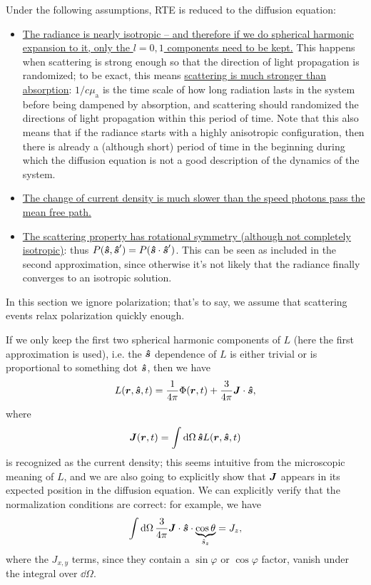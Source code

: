 \documentclass[hyperref, a4paper]{article}
\begin{document}
Under the following assumptions, RTE is reduced to the diffusion equation: 
\begin{itemize}
    \item \ul{The radiance is nearly isotropic 
    -- and therefore if we do spherical harmonic expansion to it, 
    only the $l = 0, 1$ components need to be kept.} 
    This happens when scattering is strong enough 
    so that the direction of light propagation 
    is randomized; 
    to be exact, this means \ul{scattering is much stronger than absorption}:
    $1 / c \mu_{\text{a}}$ is the time scale of 
    how long radiation lasts in the system before being dampened by absorption, 
    and scattering should randomized the directions of light propagation 
    within this period of time. 
    Note that this also means that if the radiance starts with a highly 
    anisotropic configuration, 
    then there is already a (although short) period of time in the beginning 
    during which the diffusion equation is not a good description 
    of the dynamics of the system. 
    \item \ul{The change of current density is much slower 
    than the speed photons pass the mean free path.}
    \item \ul{The scattering property has rotational symmetry (although not completely isotropic)}:
        thus $P(\vu*{s}, \vu*{s}') = P(\vu*{s} \cdot \vu*{s}')$.
        This can be seen as included in the second approximation, 
        since otherwise it's not likely that the radiance finally converges to 
        an isotropic solution.
\end{itemize}

In this section we ignore polarization;
that's to say, we assume that scattering events 
relax polarization quickly enough.

If we only keep the first two spherical harmonic components of $L$
(here the first approximation is used), 
i.e. the $\vu*{s}$ dependence of $L$ 
is either trivial 
or is proportional to something dot $\vu*{s}$, 
then we have
\begin{equation}
    L(\vb*{r}, \vu*{s}, t) = \frac{1}{4 \pi} \Phi(\vb*{r}, t) 
    + \frac{3}{4 \pi} \vb*{J} \cdot \vu*{s},
    \label{eq:diffusion-radiance}
\end{equation}
where 
\begin{equation}
    \vb*{J}(\vb*{r}, t) = \int \dd{\Omega} \vu*{s} L(\vb*{r}, \vu*{s}, t)
\end{equation}
is recognized as the current density; 
this seems intuitive from the microscopic meaning of $L$,
and we are also going to explicitly show that $\vb*{J}$
appears in its expected position in the diffusion equation.
We can explicitly verify that the normalization conditions are correct: 
for example, we have 
\begin{equation}
    \int \dd{\Omega} \frac{3}{4 \pi} \vb*{J} \cdot \vu*{s} \cdot \underbrace{\cos \theta}_{\hat{s}_z} = 
    J_z, 
\end{equation} 
where the $J_{x, y}$ terms, since they contain a $\sin \varphi$ or $\cos \varphi$ factor, 
vanish under the integral over $\dd \Omega$. 
\end{document}
